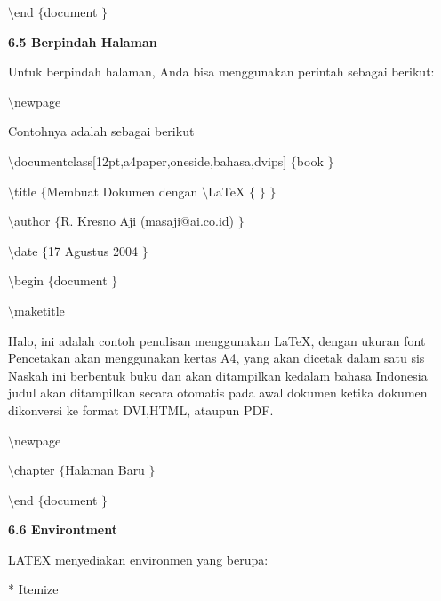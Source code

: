 {\fontsize{10pt}{10pt}\selectfont  $  \setminus  $end $  \{  $document $  \}  $}
 \par
\vspace{12pt}
\textbf{6.5 Berpindah Halaman}
 \par
Untuk berpindah halaman, Anda bisa menggunakan perintah sebagai berikut: \par
{\fontsize{10pt}{10pt}\selectfont  $  \setminus  $newpage} \par
\vspace{9pt}
Contohnya adalah sebagai berikut \par
{\fontsize{10pt}{10pt}\selectfont  $  \setminus  $documentclass[12pt,a4paper,oneside,bahasa,dvips] $  \{  $book $  \}  $} \par
{\fontsize{10pt}{10pt}\selectfont  $  \setminus  $title $  \{  $Membuat Dokumen dengan  $  \setminus  $LaTeX $  \{  $ $  \}  $ $  \}  $} \par
{\fontsize{10pt}{10pt}\selectfont  $  \setminus  $author $  \{  $R. Kresno Aji (masaji@ai.co.id) $  \}  $} \par
{\fontsize{10pt}{10pt}\selectfont  $  \setminus  $date $  \{  $17 Agustus 2004 $  \}  $} \par
{\fontsize{10pt}{10pt}\selectfont  $  \setminus  $begin $  \{  $document $  \}  $} \par
{\fontsize{10pt}{10pt}\selectfont  $  \setminus  $maketitle} \par
\vspace{10pt}
{\fontsize{10pt}{10pt}\selectfont Halo, ini adalah contoh penulisan menggunakan LaTeX, dengan ukuran font Pencetakan akan menggunakan kertas A4, yang akan dicetak dalam satu sis Naskah ini berbentuk buku dan akan ditampilkan kedalam bahasa Indonesia judul akan ditampilkan secara otomatis pada awal dokumen ketika dokumen dikonversi ke format DVI,HTML, ataupun PDF.} \par
\vspace{10pt}
{\fontsize{10pt}{10pt}\selectfont  $  \setminus  $newpage} \par
{\fontsize{10pt}{10pt}\selectfont  $  \setminus  $chapter $  \{  $Halaman Baru $  \}  $} \par
{\fontsize{10pt}{10pt}\selectfont  $  \setminus  $end $  \{  $document $  \}  $} \par
\vspace{12pt}
\textbf{6.6 Environtment} \par
LATEX menyediakan environmen yang berupa: \par
* Itemize \par
